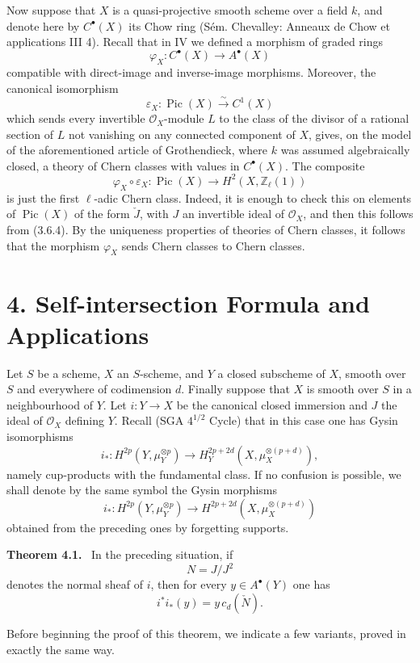 \documentclass[11pt]{article}
\newenvironment{statement}[1]{\par\medskip\noindent\textbf{#1.}\ }{\par\medskip}
\providecommand{\Pic}{\operatorname{Pic}}
\begin{document}
Now suppose that $X$ is a quasi-projective smooth scheme over a field $k$, and denote here by $C^{\bullet}(X)$ its Chow ring (Sém. Chevalley: Anneaux de Chow et applications III 4). Recall that in IV we defined a morphism of graded rings
\[
\varphi_X:C^{\bullet}(X)\to A^{\bullet}(X)
\]
compatible with direct-image and inverse-image morphisms. Moreover, the canonical isomorphism
\[
\varepsilon_X:\Pic(X)\xrightarrow{\sim} C^1(X)
\]
which sends every invertible $\mathcal O_X$-module $L$ to the class of the divisor of a rational section of $L$ not vanishing on any connected component of $X$, gives, on the model of the aforementioned article of Grothendieck, where $k$ was assumed algebraically closed, a theory of Chern classes with values in $C^{\bullet}(X)$. The composite
\[
\varphi_X\circ\varepsilon_X:\Pic(X)\longrightarrow H^2(X,\mathbb Z_\ell(1))
\]
is just the first $\ell$-adic Chern class. Indeed, it is enough to check this on elements of $\Pic(X)$ of the form $\check J$, with $J$ an invertible ideal of $\mathcal O_X$, and then this follows from (3.6.4). By the uniqueness properties of theories of Chern classes, it follows that the morphism $\varphi_X$ sends Chern classes to Chern classes.

\section*{4. Self-intersection Formula and Applications}

Let $S$ be a scheme, $X$ an $S$-scheme, and $Y$ a closed subscheme of $X$, smooth over $S$ and everywhere of codimension $d$. Finally suppose that $X$ is smooth over $S$ in a neighbourhood of $Y$. Let $i:Y\to X$ be the canonical closed immersion and $J$ the ideal of $\mathcal O_X$ defining $Y$. Recall (SGA $4^{1/2}$ Cycle) that in this case one has Gysin isomorphisms
\[
i_*:H^{2p}(Y,\mu_Y^{\otimes p})
\to H_Y^{2p+2d}(X,\mu_X^{\otimes(p+d)}),
\]
namely cup-products with the fundamental class. If no confusion is possible, we shall denote by the same symbol the Gysin morphisms
\[
i_*:H^{2p}(Y,\mu_Y^{\otimes p})
\to H^{2p+2d}(X,\mu_X^{\otimes(p+d)})
\]
obtained from the preceding ones by forgetting supports.

\begin{statement}{Theorem 4.1}
In the preceding situation, if
\[
N=J/J^2
\]
denotes the normal sheaf of $i$, then for every $y\in A^{\bullet}(Y)$ one has
\[
i^*i_*(y)=y\,c_d(\check N).
\]
\end{statement}

Before beginning the proof of this theorem, we indicate a few variants, proved in exactly the same way.
\end{document}
